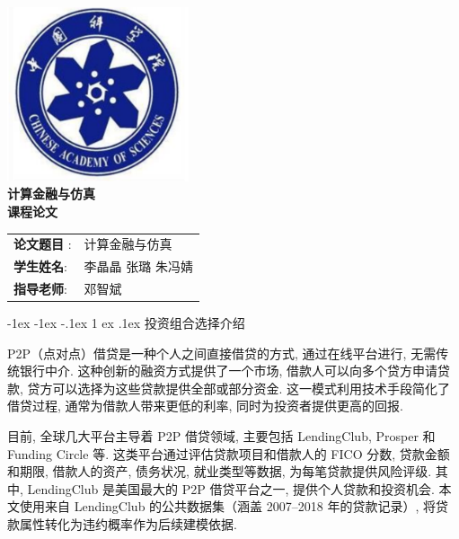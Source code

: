 \documentclass[12pt,nonblindrev]{write_paper}
\makeatletter
\renewcommand\section{\@startsection {section}{1}{\z@}%
                                   {-1ex \@plus -1ex \@minus -.1ex}%
                                   {1 ex \@plus.1ex}%
                                   {\normalfont\large\bfseries}}
\makeatother
\begin{document}
\vspace*{\fill}

\begin{center}

    \includegraphics[width=0.4\textwidth]{Figures/校徽.png}\\[1cm]
       \Huge \bfseries
       \textbf{计算金融与仿真}\\[0.5cm]
       \Huge \bfseries
       \textbf{课程论文}\\[2cm]
    
    \Large
    \begin{table}[htbp]
    \centering
    \Large
    \begin{tabular}{ll}
    \textbf{论文题目 }: & 计算金融与仿真 \\
    \textbf{学生姓名}: & 李晶晶 \quad 张璐 \quad 朱冯婧 \\
    \textbf{指导老师}: & 邓智斌 
    \end{tabular}
    \end{table}

    


\end{center}

\vspace*{\fill}
\newpage





\section{投资组合选择介绍}


P2P（点对点）借贷是一种个人之间直接借贷的方式, 通过在线平台进行, 无需传统银行中介. 这种创新的融资方式提供了一个市场, 借款人可以向多个贷方申请贷款, 贷方可以选择为这些贷款提供全部或部分资金. 这一模式利用技术手段简化了借贷过程, 通常为借款人带来更低的利率, 同时为投资者提供更高的回报. 

目前, 全球几大平台主导着 P2P 借贷领域, 主要包括 LendingClub, Prosper 和 Funding Circle 等. 这类平台通过评估贷款项目和借款人的 FICO 分数, 贷款金额和期限, 借款人的资产, 债务状况, 就业类型等数据, 为每笔贷款提供风险评级. 其中, LendingClub 是美国最大的 P2P 借贷平台之一, 提供个人贷款和投资机会. 本文使用来自 LendingClub 的公共数据集（涵盖 2007--2018 年的贷款记录）, 将贷款属性转化为违约概率作为后续建模依据. 
\end{document}
